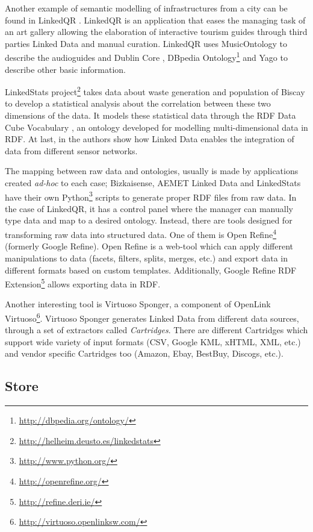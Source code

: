 Another example of semantic modelling of infrastructures from a city can be found in LinkedQR \cite{emaldi2012linkedqr}. LinkedQR is an application that eases the managing task of an art gallery allowing the elaboration of interactive tourism guides through third parties Linked Data and manual curation. LinkedQR uses MusicOntology \cite{raimond2007music} to describe the audioguides and Dublin Core \cite{weibel1998dublin}, DBpedia Ontology\footnote{\url{http://dbpedia.org/ontology/}} and Yago \cite{suchanek2007yago} to describe other basic information.

LinkedStats project\footnote{\url{http://helheim.deusto.es/linkedstats}} takes data about waste generation and population of Biscay to develop a statistical analysis about the correlation between these two dimensions of the data. It models these statistical data through the RDF Data Cube Vocabulary \cite{_rdf_2013}, an ontology developed for modelling multi-dimensional data in RDF. At last, in \cite{stasch2011aggregating} the authors show how Linked Data enables the integration of data from different sensor networks.

The mapping between raw data and ontologies, usually is made by applications created \textit{ad-hoc} to each case; Bizkaisense, AEMET Linked Data and LinkedStats have their own Python\footnote{\url{http://www.python.org/}} scripts to generate proper RDF files from raw data. In the case of LinkedQR, it has a control panel where the manager can manually type data and map to a desired ontology. Instead, there are tools designed for transforming raw data into structured data. One of them is Open Refine\footnote{\url{http://openrefine.org/}} (formerly Google Refine). Open Refine is a web-tool which can apply different manipulations to data (facets, filters, splits, merges, etc.) and export data in different formats based on custom templates. Additionally, Google Refine RDF Extension\footnote{\url{http://refine.deri.ie/}} allows exporting data in RDF.

Another interesting tool is Virtuoso Sponger, a component of OpenLink Virtuoso\footnote{\url{http://virtuoso.openlinksw.com/}}. Virtuoso Sponger generates Linked Data from different data sources, through a set of extractors called \textit{Cartridges}. There are different Cartridges which support wide variety of input formats (CSV, Google KML, xHTML, XML, etc.) and vendor specific Cartridges too (Amazon, Ebay, BestBuy, Discogs, etc.).

\subsection{Store}

